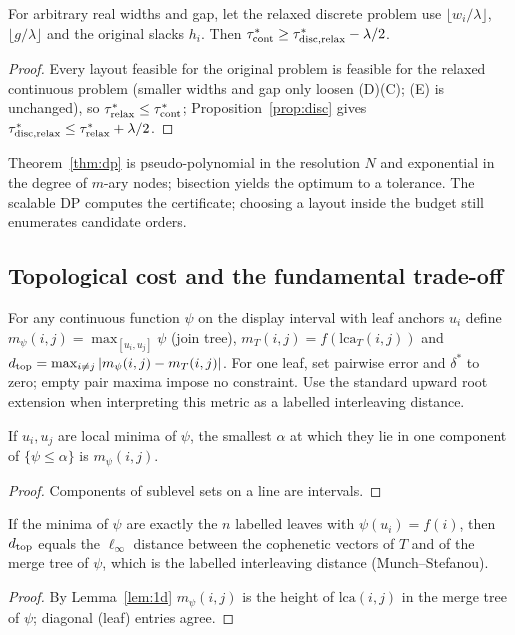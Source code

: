 \begin{proposition}\label{prop:lb}For arbitrary real widths and gap, let the relaxed discrete problem use $\lfloor w_i/\lambda\rfloor$, $\lfloor g/\lambda\rfloor$ and the original slacks $h_i$. Then $\tau^*_{\rm cont}\ge\tau^*_{\rm disc,relax}-\lambda/2$.\end{proposition}
\begin{proof}Every layout feasible for the original problem is feasible for the relaxed continuous problem (smaller widths and gap only loosen (D)(C); (E) is unchanged), so $\tau^*_{\rm relax}\le\tau^*_{\rm cont}$; Proposition~\ref{prop:disc} gives $\tau^*_{\rm disc,relax}\le\tau^*_{\rm relax}+\lambda/2$.\end{proof}
\begin{remark}Theorem~\ref{thm:dp} is pseudo-polynomial in the resolution $N$ and exponential in the degree of $m$-ary nodes; bisection yields the optimum to a tolerance. The scalable DP computes the certificate; choosing a layout inside the budget still enumerates candidate orders.\end{remark}

\subsection{Topological cost and the fundamental trade-off}
For any continuous function $\psi$ on the display interval with leaf anchors $u_i$ define $m_\psi(i,j)=\max_{[u_i,u_j]}\psi$ (join tree), $m_T(i,j)=f(\mathrm{lca}_T(i,j))$ and $d_{\rm top}=\max_{i\ne j}|m_\psi(i,j)-m_T(i,j)|$. For one leaf, set pairwise error and $\delta^*$ to zero; empty pair maxima impose no constraint. Use the standard upward root extension when interpreting this metric as a labelled interleaving distance.
\begin{lemma}\label{lem:1d}If $u_i,u_j$ are local minima of $\psi$, the smallest $\alpha$ at which they lie in one component of $\{\psi\le\alpha\}$ is $m_\psi(i,j)$.\end{lemma}
\begin{proof}Components of sublevel sets on a line are intervals.\end{proof}
\begin{proposition}\label{prop:interleave}If the minima of $\psi$ are exactly the $n$ labelled leaves with $\psi(u_i)=f(i)$, then $d_{\rm top}$ equals the $\ell_\infty$ distance between the cophenetic vectors of $T$ and of the merge tree of $\psi$, which is the labelled interleaving distance (Munch--Stefanou).\end{proposition}
\begin{proof}By Lemma~\ref{lem:1d} $m_\psi(i,j)$ is the height of $\mathrm{lca}(i,j)$ in the merge tree of $\psi$; diagonal (leaf) entries agree.\end{proof}

